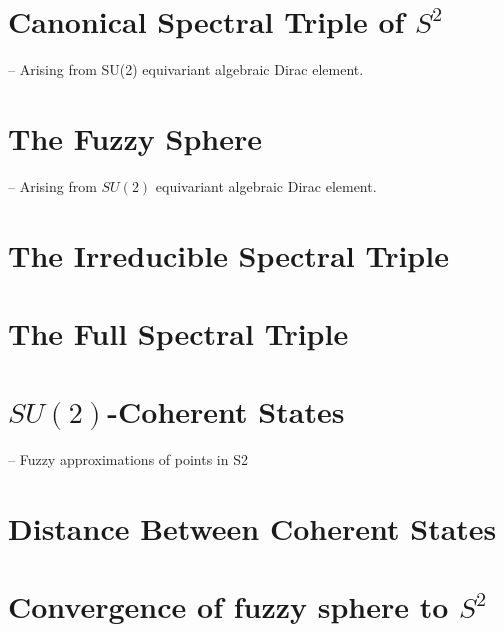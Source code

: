 \section{Canonical Spectral Triple of $S^2$}

-- Arising from SU(2) equivariant algebraic Dirac element.

\section{The Fuzzy Sphere}

-- Arising from $SU(2)$ equivariant algebraic Dirac element.

\section{The Irreducible Spectral Triple}

\section{The Full Spectral Triple}

\section{$SU(2)$-Coherent States}

-- Fuzzy approximations of points in S2

\section{Distance Between Coherent States}

\section{Convergence of fuzzy sphere to $S^2$}